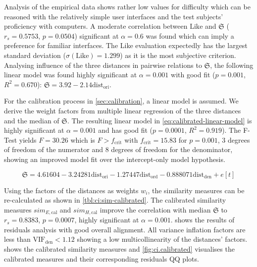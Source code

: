 Analysis of the empirical data shows rather low values for difficulty which can be reasoned with the relatively simple user interfaces and the test subjects' proficiency with computers.
A moderate correlation between \(\text{Like}\) and \(\mathfrak{S}\) (\(r_s=0.5753\), \(p=0.0504\)) significant at \(\alpha=0.6\) was found which can imply a preference for familiar interfaces.
The Like evaluation expectedly has the largest standard deviation (\(\sigma(\text{Like})=1.299\)) as it is the most subjective criterion.
Analysing influence of the three distances in pairwise relations to \(\mathfrak{S}\), the following linear model was found highly significant at \(\alpha=0.001\) with good fit (\(p=0.001\), \(R^2=0.670\)): \(\mathfrak{S}=3.92 - 2.14 \text{dist}_{\text{ori}}\).

For the calibration process in \cref{sec:calibration}, a linear model is assumed.
We derive the weight factors from multiple linear regression of the three distances and the median of \(\mathfrak{S}\).
The resulting linear model in \cref{eq:calibrated-linear-model} is highly significant at \(\alpha = 0.001\) and has good fit (\(p=0.0001\), \(R^2=0.919\)).
The F-Test yields \(F=30.26\) which is \(F>f_{\text{crit}}\) with \(f_{\text{crit}}=15.83\) for \(p=0.001\), 3 degrees of freedom of the numerator and 8 degrees of freedom for the denominator, showing an improved model fit over the intercept-only model hypothesis.

\begin{equation}\mathfrak{S}=4.61604 -3.24281\text{dist}_{\text{ori}} -1.27447\text{dist}_{\text{ord}} -0.888071\text{dist}_{\text{den}} + e[t] \label{eq:calibrated-linear-model}\end{equation}

Using the factors of the distances as weights \(w_i\), the similarity measures can be re-calculated as shown in \cref{tbl:ci:sim-calibrated}.
The calibrated similarity measures \(sim_{E,\text{cal}}\) and \(sim_{H,\text{cal}}\) improve the correlation with median \(\mathfrak{S}\) to \(r_s=0.8383\), \(p=0.0007\), highly significant at \(\alpha = 0.001\).
 shows the results of residuals analysis with good overall alignment.
All variance inflation factors are less than \(\text{VIF}_{\text{den}} < 1.12\) showing a low multicollinearity of the distances' factors.
 shows the calibrated similarity measures and \cref{fig:ci.calibrated} visualises the calibrated measures and their corresponding residuals QQ plots.

